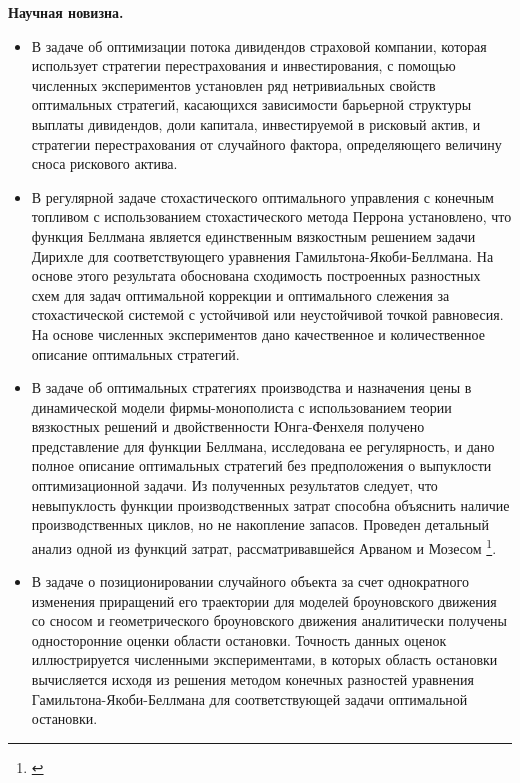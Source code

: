 \documentclass[twoside,12pt]{article}
\begin{document}
\textbf{Научная новизна.}
\begin{itemize}
 \item[(1)] В задаче об оптимизации потока дивидендов страховой компании, которая использует стратегии перестрахования и инвестирования, с помощью численных экспериментов установлен ряд нетривиальных свойств оптимальных стратегий, касающихся зависимости барьерной структуры выплаты дивидендов, доли капитала, инвестируемой в рисковый актив, и стратегии перестрахования от случайного фактора, определяющего величину сноса рискового актива.

\item[(2)] В регулярной задаче стохастического оптимального управления с конечным топливом с использованием стохастического метода Перрона установлено, что функция Беллмана является единственным вязкостным решением задачи Дирихле для соответствующего уравнения Гамильтона-Якоби-Беллмана. На основе этого результата обоснована сходимость построенных разностных схем для задач оптимальной коррекции и оптимального слежения за стохастической системой с устойчивой или неустойчивой точкой равновесия. На основе численных экспериментов дано качественное и количественное описание оптимальных стратегий.

\item[(3)] В задаче об оптимальных стратегиях производства и назначения цены в динамической модели фирмы-монополиста с использованием теории вязкостных решений и двойственности Юнга-Фенхеля получено представление для функции Беллмана, исследована ее регулярность, и дано полное описание оптимальных стратегий без предположения о выпуклости оптимизационной задачи. Из полученных результатов следует, что невыпуклость функции производственных затрат способна объяснить наличие производственных циклов, но не накопление запасов. Проведен детальный анализ одной из функций затрат, рассматривавшейся Арваном и Мозесом \footnote{\label{ArvMos} \cite{ArvMos81}}.

\item[(4)] В задаче о позиционировании случайного объекта за счет однократного изменения приращений его траектории для моделей броуновского движения со сносом и геометрического броуновского движения аналитически получены односторонние оценки области остановки. Точность данных оценок иллюстрируется численными экспериментами, в которых область остановки вычисляется исходя из решения методом конечных разностей уравнения Гамильтона-Якоби-Беллмана для соответствующей задачи оптимальной остановки.
\end{itemize}
\end{document}
